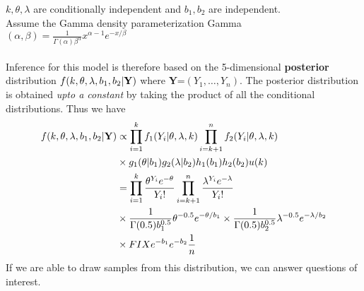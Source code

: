 \documentclass[11pt]{article}
\begin{document}
$k,\theta,\lambda$ are conditionally independent and $b_1,b_2$ are independent. \\ Assume the Gamma density parameterization Gamma$(\alpha,\beta) = \frac{1}{\Gamma(\alpha)\beta^{\alpha}} x^{\alpha-1} e^{-x/\beta}$\\\\
Inference for this model is therefore based on the 5-dimensional
{\bf posterior} distribution $f(k,\theta,\lambda,b_1,b_2| {\bf Y})$ where
{\bf Y}=$(Y_1,\dots,Y_n)$. The posterior distribution is obtained {\it upto a constant} by
taking the product of all the conditional distributions. Thus we have
\begin{equation*}
\begin{split}
f(k,\theta,\lambda,b_1,b_2| {\bf Y}) & \propto \prod_{i=1}^k f_1(Y_i|\theta,\lambda,k) \prod_{i=k+1}^n f_2(Y_i|\theta,\lambda,k)\\
& \times g_1(\theta|b_1) g_2(\lambda|b_2) h_1(b_1) h_2(b_2) u(k)\\
& = \prod_{i=1}^k \frac{\theta^{Y_i} e^{-\theta}}{Y_i !} \prod_{i=k+1}^n \frac{\lambda^{Y_i} e^{-\lambda}}{Y_i !} \\
& \times  \frac{1}{\Gamma(0.5)b_1^{0.5}} \theta^{-0.5} e^{-\theta/b_1} \times \frac{1}{\Gamma(0.5)b_2^{0.5}} \lambda^{-0.5} e^{-\lambda/b_2}\\ 
& \times FIX e^{-b_1} e^{-b_2} \frac{1}{n}
\end{split}
\end{equation*}
If we are able to draw samples from this distribution, we can answer
questions of interest. %
\end{document}
